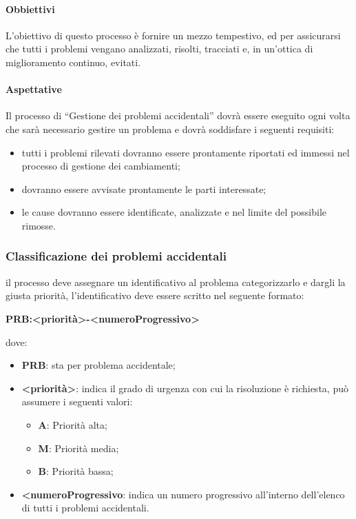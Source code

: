             \paragraph{Obbiettivi}
                L'obiettivo di questo processo è fornire un mezzo tempestivo,  ed per assicurarsi che tutti i problemi vengano analizzati, risolti, tracciati e, in un'ottica di miglioramento continuo, evitati.
            \paragraph{Aspettative}
            Il processo di “Gestione dei problemi accidentali” dovrà essere eseguito ogni volta che sarà necessario gestire un problema e dovrà soddisfare i seguenti requisiti: 
            \begin{itemize}
                \item tutti i problemi rilevati dovranno essere prontamente riportati ed immessi nel processo di gestione dei cambiamenti;
                \item dovranno essere avvisate prontamente le parti interessate;
                \item le cause dovranno essere identificate, analizzate e nel limite del possibile rimosse.
            \end{itemize}
        \subsubsection{Classificazione dei problemi accidentali}
            il processo deve assegnare un identificativo al problema categorizzarlo e dargli la giusta priorità, l’identificativo deve essere scritto nel seguente formato:
            \begin{center}
                \textbf{PRB:<priorità>-<numeroProgressivo>}
            \end{center}
            dove:
            \begin{itemize}
                \item\textbf{PRB}: sta per problema accidentale;
                \item\textbf{<priorità>}: indica il grado di urgenza con cui la risoluzione è richiesta, può assumere i seguenti valori:
                    \begin{itemize}
                        \item\textbf{A}: Priorità alta;
                        \item\textbf{M}: Priorità media;
                        \item\textbf{B}: Priorità bassa;
                    \end{itemize}
                \item\textbf{<numeroProgressivo}: indica un numero progressivo all’interno dell’elenco di tutti i problemi accidentali.
            \end{itemize}
